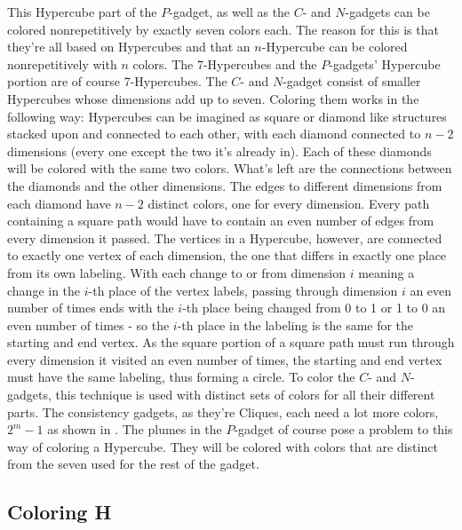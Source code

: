 \documentclass[12pt,a4paper]{article}
\begin{document}
\newline
This Hypercube part of the $P$-gadget, as well as the $C$- and $N$-gadgets can be colored nonrepetitively by exactly seven colors each. The reason for this is that they're all based on Hypercubes and that an $n$-Hypercube can be colored nonrepetitively with $n$ colors. The 7-Hypercubes and the $P$-gadgets' Hypercube portion are of course 7-Hypercubes. The $C$- and $N$-gadget consist of smaller Hypercubes whose dimensions add up to seven. Coloring them works in the following way: Hypercubes can be imagined as square or diamond like structures stacked upon and connected to each other, with each diamond connected to $n-2$ dimensions (every one except the two it's already in). Each of these diamonds will be colored with the same two colors. What's left are the connections between the diamonds and the other dimensions. The edges to different dimensions from each diamond have $n-2$ distinct colors, one for every dimension. Every path containing a square path would have to contain an even number of edges from every dimension it passed. The vertices in a Hypercube, however, are connected to exactly one vertex of each dimension, the one that differs in exactly one place from its own labeling. With each change to or from dimension $i$ meaning a change in the $i$-th place of the vertex labels, passing through dimension $i$ an even number of times ends with the $i$-th place being changed from 0 to 1 or 1 to 0 an even number of times - so the $i$-th place in the labeling is the same for the starting and end vertex. As the square portion of a square path must run through every dimension it visited an even number of times, the starting and end vertex must have the same labeling, thus forming a circle. 
\newline
To color the $C$- and $N$-gadgets, this technique is used with distinct sets of colors for all their different parts. The consistency gadgets, as they're Cliques, each need a lot more colors, $2^m-1$ as shown in \citep{Alon2002}.
\newline
The plumes in the $P$-gadget of course pose a problem to this way of coloring a Hypercube. They will be colored with colors that are distinct from the seven used for the rest of the gadget.

\subsection{Coloring H}
\end{document}
